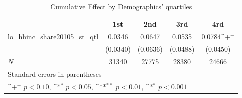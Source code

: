 \begin{table}[htbp]\centering
\def\sym#1{\ifmmode^{#1}\else\(^{#1}\)\fi}
\caption{Cumulative Effect by Demographics' quartiles}
\begin{tabular}{l*{4}{c}}
\hline\hline
            &\multicolumn{1}{c}{1st}&\multicolumn{1}{c}{2nd}&\multicolumn{1}{c}{3rd}&\multicolumn{1}{c}{4rd}\\
\hline
lo\_hhinc\_share20105\_st\_qtl&      0.0346       &      0.0647       &      0.0535       &      0.0784\sym{+}\\
            &    (0.0340)       &    (0.0636)       &    (0.0488)       &    (0.0450)       \\
\hline
\(N\)       &       31340       &       27775       &       28380       &       24666       \\
\hline\hline
\multicolumn{5}{l}{\footnotesize Standard errors in parentheses}\\
\multicolumn{5}{l}{\footnotesize \sym{+} \(p<0.10\), \sym{*} \(p<0.05\), \sym{**} \(p<0.01\), \sym{*} \(p<0.001\)}\\
\end{tabular}
\end{table}
